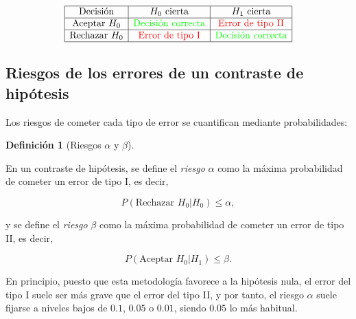 \documentclass[
  a4paper,
]{scrreport}
\theoremstyle{definition}
\newtheorem{definition}{Definición}[chapter]
\theoremstyle{definition}
\theoremstyle{plain}
\theoremstyle{remark}
\begin{document}
\[
\begin{array}{|c|c|c|}
\hline
\mbox{Decisión} & H_0 \mbox{ cierta} & H_1 \mbox{ cierta} \\
\hline
\mbox{Aceptar } H_0 & \color{green}{\mbox{Decisión correcta}} & \color{red}{\mbox{Error de tipo II}} \\
\hline
\mbox{Rechazar }H_0 & \color{red}{\mbox{Error de tipo I}} & \color{green}{\mbox{Decisión correcta}} \\
\hline
\end{array}
\]

\hypertarget{riesgos-de-los-errores-de-un-contraste-de-hipuxf3tesis}{%
\subsection{Riesgos de los errores de un contraste de
hipótesis}\label{riesgos-de-los-errores-de-un-contraste-de-hipuxf3tesis}}

Los riesgos de cometer cada tipo de error se cuantifican mediante
probabilidades:

\begin{definition}[Riesgos \(\alpha\) y
\(\beta\)]\protect\hypertarget{def-riesgos-alfa-beta}{}\label{def-riesgos-alfa-beta}

En un contraste de hipótesis, se define el \emph{riesgo} \(\alpha\) como
la máxima probabilidad de cometer un error de tipo I, es decir,

\[
P(\mbox{Rechazar }H_0|H_0) \leq \alpha,
\]

y se define el \emph{riesgo} \(\beta\) como la máxima probabilidad de
cometer un error de tipo II, es decir,

\[
P(\mbox{Aceptar }H_0|H_1) \leq \beta.
\]

\end{definition}

\begin{tcolorbox}[enhanced jigsaw, colbacktitle=quarto-callout-warning-color!10!white, toptitle=1mm, colback=white, toprule=.15mm, bottomrule=.15mm, rightrule=.15mm, left=2mm, colframe=quarto-callout-warning-color-frame, coltitle=black, bottomtitle=1mm, arc=.35mm, titlerule=0mm, title=\textcolor{quarto-callout-warning-color}{\faExclamationTriangle}\hspace{0.5em}{Advertencia}, breakable, opacitybacktitle=0.6, leftrule=.75mm, opacityback=0]

En principio, puesto que esta metodología favorece a la hipótesis nula,
el error del tipo I suele ser más grave que el error del tipo II, y por
tanto, el riesgo \(\alpha\) suele fijarse a niveles bajos de \(0.1\),
\(0.05\) o \(0.01\), siendo \(0.05\) lo más habitual.

\end{tcolorbox}
\end{document}
